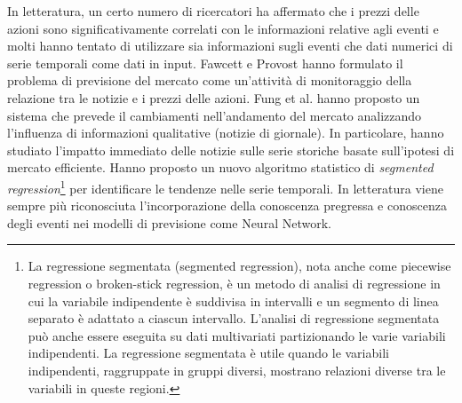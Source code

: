 \documentclass[a4paper,12pt]{report}
\begin{document}
In letteratura, un certo numero di ricercatori ha affermato che i prezzi delle azioni sono significativamente correlati con le informazioni relative agli eventi e molti hanno tentato di utilizzare sia informazioni sugli eventi che dati numerici di serie temporali come dati in input. Fawcett e Provost \cite{4} hanno formulato il problema di previsione del mercato come un'attività di monitoraggio della relazione tra le notizie e i prezzi delle azioni. Fung et al. \cite{news-nn} hanno proposto un sistema che prevede il cambiamenti nell'andamento del mercato analizzando l'influenza di informazioni qualitative (notizie di giornale). In particolare, hanno studiato l'impatto immediato delle notizie sulle serie storiche basate sull'ipotesi di mercato efficiente. Hanno proposto un nuovo algoritmo statistico di \textit{segmented regression}\footnote{La regressione segmentata (segmented regression), nota anche come piecewise regression o broken-stick regression, è un metodo di analisi di regressione in cui la variabile indipendente è suddivisa in intervalli e un segmento di linea separato è adattato a ciascun intervallo. L'analisi di regressione segmentata può anche essere eseguita su dati multivariati partizionando le varie variabili indipendenti. La regressione segmentata è utile quando le variabili indipendenti, raggruppate in gruppi diversi, mostrano relazioni diverse tra le variabili in queste regioni.} per identificare le tendenze nelle serie temporali. In letteratura viene sempre più riconosciuta l'incorporazione della conoscenza pregressa e conoscenza degli eventi nei modelli di previsione come Neural Network.
\end{document}
